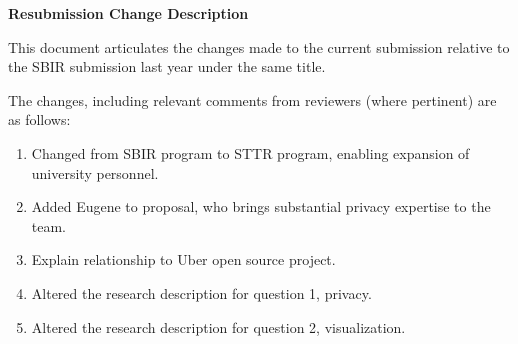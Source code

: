 \documentclass[11pt]{article}
\begin{document}
\pagestyle{plain}
\thispagestyle{plain}

\begin{center}
\textbf{\Large Resubmission Change Description}
\end{center}

This document articulates the changes made to the current submission relative
to the SBIR submission last year under the same title.

The changes, including relevant comments from reviewers (where pertinent)
are as follows:

\begin{enumerate}

\item Changed from SBIR program to STTR program, enabling expansion of
university personnel.

\item Added Eugene to proposal, who brings substantial privacy expertise
to the team.

\item Explain relationship to Uber open source project.

\item Altered the research description for question 1, privacy.

\item Altered the research description for question 2, visualization.

\end{enumerate}
\end{document}
